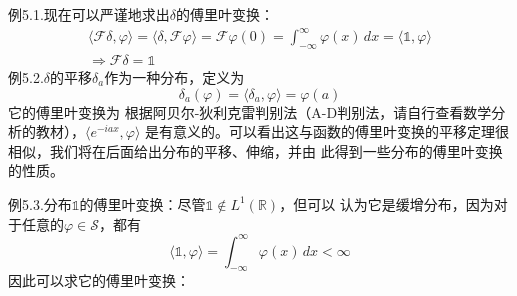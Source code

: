 \documentclass{ctexbook}
\begin{document}
\noindent 例5.1.现在可以严谨地求出$\delta$的傅里叶变换：
\begin{align*}
    \langle\mathcal{F}\delta,\varphi\rangle=\langle \delta,\mathcal{F}\varphi\rangle=\mathcal{F}\varphi(0)=\int_{-\infty}^{\infty}\varphi(x)\,dx=\langle \mathds{1},\varphi\rangle \\
    \Rightarrow\mathcal{F}\delta =\mathds{1}
\end{align*}
例5.2.$\delta$的平移$\delta_a$作为一种分布，定义为
\begin{equation}
    \delta_a(\varphi)=\langle \delta_a,\varphi\rangle=\varphi(a)
\end{equation}
它的傅里叶变换为
根据阿贝尔-狄利克雷判别法（A-D判别法，请自行查看数学分析的教材），$\langle e^{-i a x},\varphi\rangle$
是有意义的。可以看出这与函数的傅里叶变换的平移定理很相似，我们将在后面给出分布的平移、伸缩，并由
此得到一些分布的傅里叶变换的性质。

\noindent 例5.3.分布$\mathds{1}$的傅里叶变换：尽管$\mathds{1}\notin L^1(\mathbb{R})$，但可以
认为它是缓增分布，因为对于任意的$\varphi\in\mathcal{S} $，都有
\[\langle \mathds{1},\varphi\rangle=\int_{-\infty}^{\infty}\varphi(x)\,dx<\infty\]
因此可以求它的傅里叶变换：
\end{document}

